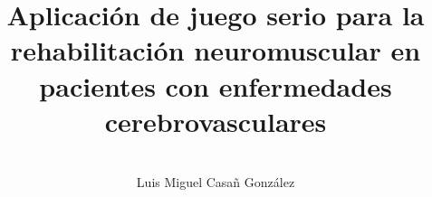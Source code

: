 \documentclass{thesis}
\title{Aplicación de juego serio para la rehabilitación
neuromuscular en pacientes con enfermedades cerebrovasculares}
\author{\\\vspace{0.25cm}Luis Miguel Casañ González}
\begin{document}
    \maketitle
    \thesisgeometry

    
    
    
    
    
    

    
\end{document}
